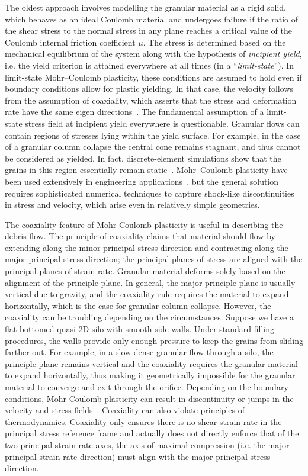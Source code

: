 The oldest approach involves modelling the granular material as a rigid solid, 
which behaves as an ideal Coulomb material and undergoes failure if the ratio 
of the shear stress to the normal stress in any plane reaches a critical value 
of the Coulomb internal friction coefficient $\mu$. The stress is determined 
based on the mechanical equilibrium of the system along with the hypothesis of 
\textit{incipient yield}, i.e. the yield criterion is attained everywhere at 
all times (in a ``\textit{limit-state}''). In limit-state Mohr–Coulomb 
plasticity, these conditions are assumed to hold
even if boundary conditions allow for plastic yielding. In that case, the 
velocity follows from the assumption of coaxiality, which asserts that the 
stress and deformation rate have the same eigen 
directions~\citep{Rycroft2009b}. The fundamental assumption of a 
limit-state stress field at incipient yield everywhere is questionable. 
Granular flows can contain regions of stresses lying within the yield surface. 
For example, in the case of a granular column collapse the central cone remains 
stagnant, and thus cannot be considered as yielded. In fact, discrete-element 
simulations show that the grains in this region essentially remain 
static~\citep{Staron2005}. Mohr–Coulomb plasticity have been used extensively 
in engineering applications~\citep{Nedderman1992}, but the general solution 
requires sophisticated numerical techniques to capture shock-like 
discontinuities in stress and velocity, which arise even in relatively simple 
geometries. 

The coaxiality feature of Mohr-Coulomb plasticity 
is useful in describing the debris flow. The principle of coaxiality
claims that material should flow by extending along the
minor principal stress direction and contracting along the major principal 
stress direction; the principal planes of stress are aligned with the principal 
planes of strain-rate. Granular material deforms solely based 
on the alignment of the principle plane. In general, the major principle plane 
is usually vertical due to gravity, and the coaxiality rule requires the 
material to expand horizontally, which is the case for granular column 
collapse. However, the coaxiality can be troubling depending on the 
circumstances. Suppose we have a flat-bottomed quasi-2D silo with smooth 
side-walls. Under standard filling procedures, the walls provide only enough 
pressure to keep the grains from sliding farther out.  For example, in a slow 
dense granular flow through a silo, the principle plane remains vertical and 
the coaxiality requires the granular material to expand horizontally, thus 
making it geometrically impossible for the granular material to converge and 
exit through the orifice. Depending 
on the boundary conditions, Mohr-Coulomb plasticity can result in discontinuity 
or jumps in the velocity and stress fields~\citep{Rycroft2006}. Coaxiality can 
also violate principles of thermodynamics. Coaxiality only ensures there is no 
shear strain-rate in the principal stress reference frame and actually does not 
directly enforce that of the two principal strain-rate axes, the axis of
maximal compression (i.e. the major principal strain-rate direction) must align 
with the major principal stress direction.

